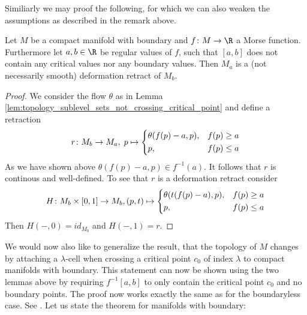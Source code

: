     Similiarly we may proof the following, for which we can also weaken the assumptions as described in the remark above.

    \begin{lemma}
        \label{lem:topology_sublevel_sets_not_crossing_critical_point_variation}
        Let $M$ be a compact manifold with boundary and $f \colon M \to \R$ a Morse function. Furthermore let $a,b \in \R$ be regular values of $f$, such that $[a,b]$ does not contain any critical values nor any boundary values. Then 
        $M_a$ is a (not necessarily smooth) deformation retract of $M_b$.
    \end{lemma}
    \begin{proof}
        We consider the flow $\theta$ as in Lemma \ref{lem:topology_sublevel_sets_not_crossing_critical_point} and define a retraction
        \[
            r \colon M_b \to M_a, \; p \mapsto \begin{dcases}
            \theta(f(p) - a,p), & f(p) \geq a \\
            p, & f(p) \leq a
        \end{dcases}
        \]
        As we have shown above $\theta(f(p) - a,p) \in f^{-1}(a)$. It follows that $r$ is continous and well-defined. To see that $r$ is a deformation retract consider
        \[
        H \colon M_b \times [0,1] \to M_b, (p,t) \mapsto \begin{dcases}
            \theta(t(f(p) - a),p), & f(p) \geq a \\
            p, & f(p) \leq a
        \end{dcases}
        \]
        Then $H(-,0) = id_{M_b}$ and $H(-,1) = r$.
    \end{proof}

    We would now also like to generalize the result, that the topology of $M$ changes by attaching a $\lambda$-cell when crossing a critical point $c_0$ of index $\lambda$ to compact manifolds with boundary. This statement can now be shown using the two lemmas above by requiring $f^{-1}[a,b]$ to only contain the critical point $c_0$ and no boundary points. The proof now works exactly the same as for the boundaryless case. See \cite{milnor1963morse}. Let us state the theorem for manifolds with boundary:
    
